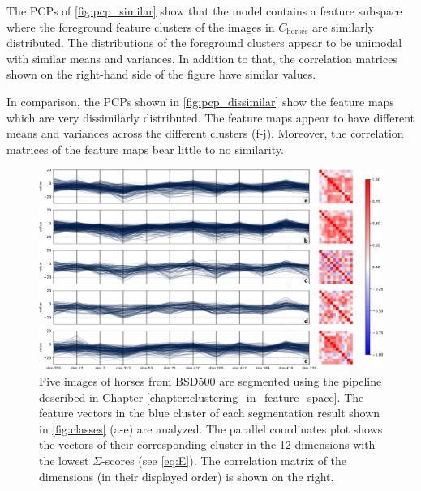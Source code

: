 The PCPs of \autoref{fig:pcp_similar} show that the model contains a feature subspace where the foreground feature clusters of the images in $C_{\text{horses}}$ are similarly distributed. The distributions of the foreground clusters appear to be unimodal with similar means and variances. In addition to that, the correlation matrices shown on the right-hand side of the figure have similar values.

In comparison, the PCPs shown in \autoref{fig:pcp_dissimilar} show the feature maps which are very dissimilarly distributed. The feature maps appear to have different means and variances across the different clusters (f-j). Moreover, the correlation matrices of the feature maps bear little to no similarity.

\begin{figure}
    \centering
    \includegraphics[width=\textheight]{figures/PCP_similar.png}
    \caption{Five images of horses from BSD500 are segmented using the pipeline described in Chapter \ref{chapter:clustering_in_feature_space}. The feature vectors in the blue cluster of each segmentation result shown in \autoref{fig:classes} (a-e) are analyzed. The parallel coordinates plot shows the vectors of their corresponding cluster in the 12 dimensions with the lowest $\Sigma$-scores (see \autoref{eq:E}). The correlation matrix of the dimensions (in their displayed order) is shown on the right.}
    \label{fig:pcp_similar}
\end{figure}

